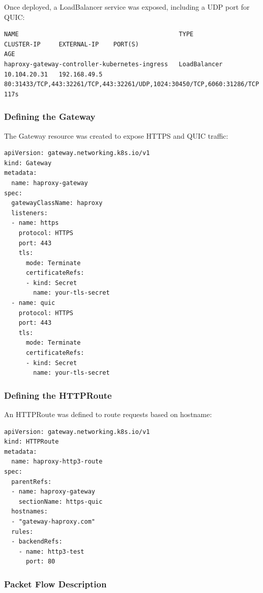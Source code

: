 Once deployed, a LoadBalancer service was exposed, including a UDP port for QUIC:

\begin{lstlisting}[breaklines=true,basicstyle=\small\ttfamily,frame=single]
NAME                                            TYPE           CLUSTER-IP     EXTERNAL-IP    PORT(S)                                                                  AGE
haproxy-gateway-controller-kubernetes-ingress   LoadBalancer   10.104.20.31   192.168.49.5   80:31433/TCP,443:32261/TCP,443:32261/UDP,1024:30450/TCP,6060:31286/TCP   117s
\end{lstlisting}

\subsubsection{Defining the Gateway}

The Gateway resource was created to expose HTTPS and QUIC traffic:

\begin{lstlisting}[breaklines=true,basicstyle=\small\ttfamily,frame=single]
apiVersion: gateway.networking.k8s.io/v1
kind: Gateway
metadata:
  name: haproxy-gateway
spec:
  gatewayClassName: haproxy
  listeners:
  - name: https
    protocol: HTTPS
    port: 443
    tls:
      mode: Terminate
      certificateRefs:
      - kind: Secret
        name: your-tls-secret
  - name: quic
    protocol: HTTPS
    port: 443
    tls:
      mode: Terminate
      certificateRefs:
      - kind: Secret
        name: your-tls-secret
\end{lstlisting}

\subsubsection{Defining the HTTPRoute}

An HTTPRoute was defined to route requests based on hostname:

\begin{lstlisting}[breaklines=true,basicstyle=\small\ttfamily,frame=single]
apiVersion: gateway.networking.k8s.io/v1
kind: HTTPRoute
metadata:
  name: haproxy-http3-route
spec:
  parentRefs:
  - name: haproxy-gateway
    sectionName: https-quic
  hostnames:
  - "gateway-haproxy.com"
  rules:
  - backendRefs:
    - name: http3-test
      port: 80
\end{lstlisting}

\subsubsection{Packet Flow Description}

